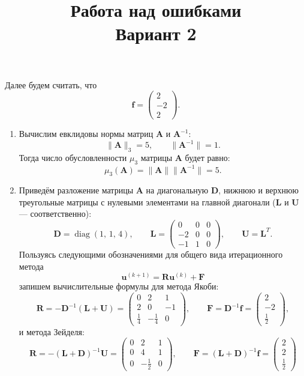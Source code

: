 \documentclass[a4paper]{article}
\title{Работа над ошибками\\
Вариант 2}
\begin{document}
	\maketitle
{}
Далее будем считать, что
\[
	\mathbf{f}=\begin{pmatrix} 2 \\ -2 \\ 2 \end{pmatrix} 
.\] 
\begin{enumerate}
	\item Вычислим евклидовы нормы матриц $\mathbf{A}$ и $\mathbf{A}^{-1}$:
\[
	\| \mathbf{A}\|_3=5,\qquad \| \mathbf{A}^{-1}\|=1
.\] 
Тогда число обусловленности $\mu_3$ матрицы $\mathbf{A}$ будет равно:
\[
	\mu_3(\mathbf{A})=\| \mathbf{A}\|\| \mathbf{A}^{-1}\|=5
.\] 
\item Приведём разложение матрицы $\mathbf{A}$ на диагональную  $\mathbf{D}$,
нижнюю и верхнюю треугольные матрицы с нулевыми элементами на главной
диагонали ($\mathbf{L}$ и $\mathbf{U}$ --- соответственно):
\[
	\mathbf{D}= \operatorname{diag}(1,\,1,\,4),\qquad
	\mathbf{L}=\begin{pmatrix}0 & 0 & 0 \\ -2 & 0 & 0 \\ -1 & 1 & 0
	\end{pmatrix}, \qquad \mathbf{U} =\mathbf{L}^T
.\]
Пользуясь следующими обозначениями для общего вида итерационного
метода
\[
	\mathbf{u}^{(k+1)}=\mathbf{R}\mathbf{u}^{(k)}+\mathbf{F}
\] 
запишем вычислительные формулы для
метода Якоби:
\[
	\mathbf{R}=-\mathbf{D}^{-1}(\mathbf{L}+\mathbf{U})
	=\begin{pmatrix} 0 & 2 &1\\2&0&-1\\\frac{1}{4}&
		-\frac{1}{4}&0\end{pmatrix} ,\qquad \mathbf{F}=\mathbf{D}^{-1}\mathbf{f}= \begin{pmatrix} 2 \\ -2 \\ \frac{1}{2}
	\end{pmatrix} 
 ,\]
и метода Зейделя:
\[
	\mathbf{R}=-(\mathbf{L}+\mathbf{D})^{-1}\mathbf{U}
	=\begin{pmatrix} 0 & 2&1\\0&4&1\\0&-\frac{1}{2}&0
		\end{pmatrix} ,\qquad \mathbf{F}=(\mathbf{L}+\mathbf{D})^{-1}\mathbf{f}= \begin{pmatrix} 2 \\ 2 \\ \frac{1}{2} \end{pmatrix} 
\]
\end{enumerate}
\end{document}
